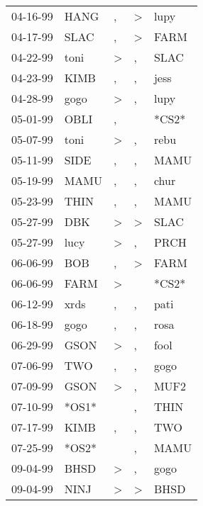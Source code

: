 \begin{supertabular}{lllll}
 04-16-99 &   HANG &                , &     \textgreater &   lupy \\
 04-17-99 &   SLAC &                , &     \textgreater &   FARM \\
 04-22-99 &   toni &     \textgreater &                , &   SLAC \\
 04-23-99 &   KIMB &                , &                , &   jess \\
 04-28-99 &   gogo &     \textgreater &                , &   lupy \\
 05-01-99 &   OBLI &                , &                  &  *CS2* \\
 05-07-99 &   toni &     \textgreater &                , &   rebu \\
 05-11-99 &   SIDE &                , &                , &   MAMU \\
 05-19-99 &   MAMU &                , &                , &   chur \\
 05-23-99 &   THIN &                , &                , &   MAMU \\
 05-27-99 &    DBK &     \textgreater &     \textgreater &   SLAC \\
 05-27-99 &   lucy &     \textgreater &                , &   PRCH \\
 06-06-99 &    BOB &                , &     \textgreater &   FARM \\
 06-06-99 &   FARM &     \textgreater &                  &  *CS2* \\
 06-12-99 &   xrds &                , &                , &   pati \\
 06-18-99 &   gogo &                , &                , &   rosa \\
 06-29-99 &   GSON &     \textgreater &                , &   fool \\
 07-06-99 &    TWO &                , &                , &   gogo \\
 07-09-99 &   GSON &     \textgreater &                , &   MUF2 \\
 07-10-99 &  *OS1* &                  &                , &   THIN \\
 07-17-99 &   KIMB &                , &                , &    TWO \\
 07-25-99 &  *OS2* &                  &                , &   MAMU \\
 09-04-99 &   BHSD &     \textgreater &                , &   gogo \\
 09-04-99 &   NINJ &     \textgreater &     \textgreater &   BHSD \\

\end{supertabular}
